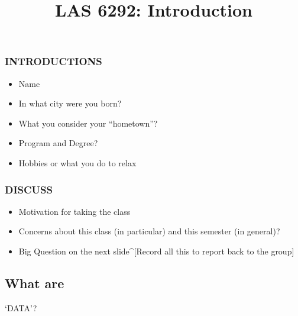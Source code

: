 \documentclass[
  letterpaper,
  DIV=11,
  numbers=noendperiod]{scrartcl}
\title{LAS 6292: Introduction}
\author{}
\date{}
\providecommand{\tightlist}{%
  \setlength{\itemsep}{0pt}\setlength{\parskip}{0pt}}\usepackage{longtable,booktabs,array}
\begin{document}
\maketitle
\ifdefined\Shaded\renewenvironment{Shaded}{\begin{tcolorbox}[borderline west={3pt}{0pt}{shadecolor}, breakable, enhanced, interior hidden, sharp corners, boxrule=0pt, frame hidden]}{\end{tcolorbox}}\fi

\hypertarget{section}{%
\subsection{}\label{section}}

\hypertarget{introductions}{%
\subsubsection{INTRODUCTIONS}\label{introductions}}

\begin{itemize}
\tightlist
\item
  Name
\item
  In what city were you born?
\item
  What you consider your ``hometown''?
\item
  Program and Degree?
\item
  Hobbies or what you do to relax
\end{itemize}

\hypertarget{discuss}{%
\subsubsection{DISCUSS}\label{discuss}}

\begin{itemize}
\tightlist
\item
  Motivation for taking the class
\item
  Concerns about this class (in particular) and this semester (in
  general)?
\item
  Big Question on the next slide\^{}{[}Record all this to report back to
  the group{]}
\end{itemize}

\hypertarget{what-are}{%
\subsection{What are}\label{what-are}}

`DATA'?
\end{document}
